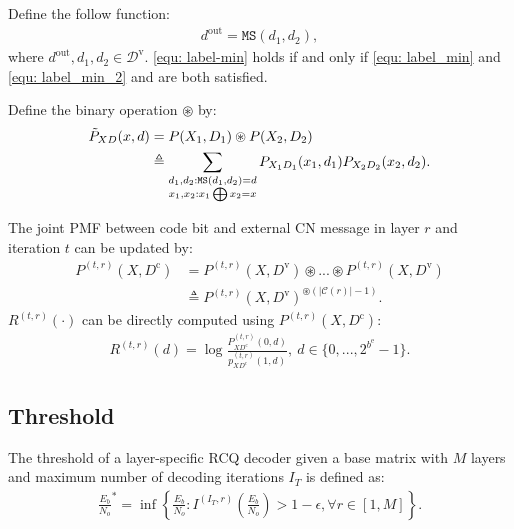 \documentclass [PhD] {uclathes}
\begin{document}
Define the follow function: 
\begin{align}\label{equ: label-min}
    d^\text{out} = \texttt{MS}(d_1,d_2),
\end{align}
 where $d^{\text{out}},d_1,d_2\in \mathcal{D}^\mathrm{v} $. \eqref{equ: label-min} holds if and only if \eqref{equ: label_min} and \eqref{equ: label_min_2} and are both satisfied.


Define the binary operation $\circledast$ by:
\begin{align}
          \Tilde{P}_{XD}(x,d) &= P(X_1,D_1)\circledast P(X_2,D_2)\\&\triangleq\sum_{\substack{d_1,d_2:\texttt{MS}(d_1,d_2)=d \\ x_1,x_2: x_1\bigoplus x_2 = x}}P_{X_1D_1}(x_1,d_1)P_{X_2D_2}(x_2,d_2)\label{equ: msrcq-c}.
\end{align}


The joint PMF between code bit and external CN message in layer $r$ and iteration $t$ can be updated by:
\begin{align}
 P^{(t,r)}(X,D^\text{c}) &=P^{(t,r)}(X,D^\text{v})\circledast ...\circledast P^{(t,r)}(X,D^\text{v})\\&\triangleq P^{(t,r)}(X,D^\text{v})^{\circledast(|\mathcal{C}(r)|-1)}. \label{equ: check_opt_prob2}
\end{align}
$R^{(t,r)}(\cdot)$ can be directly computed using $P^{(t,r)}(X,D^\text{c})$:
\begin{align}
        R^{(t,r)}(d) = \log \frac{P_{XD^\text{c}}^{(t,r)}(0,d)}{p_{XD^\text{c}}^{(t,r)}(1,d)},~d\in\{0,...,2^{b^\text{e}}-1\}.
        \label{eq: r_v}
\end{align}

\subsection{Threshold}
The threshold of a layer-specific RCQ decoder given a base matrix with $M$ layers and  maximum number of decoding iterations $I_T$ is defined as: 
\begin{align}
    \frac{E_b}{N_o}^*=\inf \left\{\frac{E_b}{N_o}:  I^{(I_T,r)}\left(\frac{E_b}{N_o}\right)> 1-\epsilon,\forall  r\in[1,M] \right\}.
\end{align}
\end{document}
